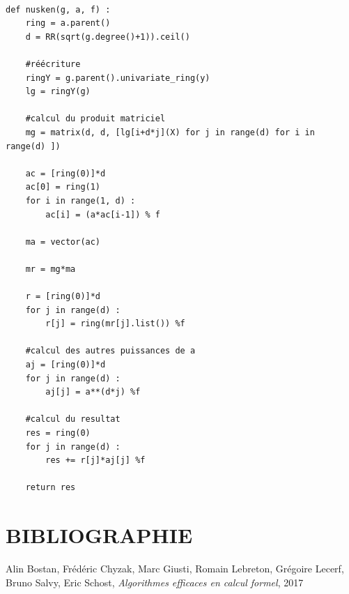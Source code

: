 \documentclass[a4paper]{article}
\begin{document}
\begin{lstlisting}[title={nusken et ziegler}]

def nusken(g, a, f) :
    ring = a.parent()
    d = RR(sqrt(g.degree()+1)).ceil()

    #réécriture
    ringY = g.parent().univariate_ring(y)
    lg = ringY(g)

    #calcul du produit matriciel
    mg = matrix(d, d, [lg[i+d*j](X) for j in range(d) for i in range(d) ])

    ac = [ring(0)]*d
    ac[0] = ring(1)
    for i in range(1, d) :
        ac[i] = (a*ac[i-1]) % f

    ma = vector(ac)
    
    mr = mg*ma

    r = [ring(0)]*d
    for j in range(d) :
        r[j] = ring(mr[j].list()) %f
    
    #calcul des autres puissances de a
    aj = [ring(0)]*d
    for j in range(d) :
        aj[j] = a**(d*j) %f

    #calcul du resultat
    res = ring(0)
    for j in range(d) :
        res += r[j]*aj[j] %f

    return res

\end{lstlisting}

\newpage
\section{BIBLIOGRAPHIE}




\begin{thebibliography}{10}
     Alin Bostan, Frédéric Chyzak, Marc Giusti, Romain Lebreton, Grégoire Lecerf, Bruno Salvy, Eric Schost,
    \emph{Algorithmes efficaces en calcul formel}, 2017

\end{thebibliography}
\end{document}
